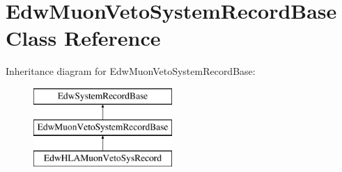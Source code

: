 \hypertarget{class_edw_muon_veto_system_record_base}{
\section{EdwMuonVetoSystemRecordBase Class Reference}
\label{class_edw_muon_veto_system_record_base}
}
Inheritance diagram for EdwMuonVetoSystemRecordBase:\begin{figure}[H]
\begin{center}
\leavevmode
\includegraphics[height=3cm]{class_edw_muon_veto_system_record_base}
\end{center}
\end{figure}
